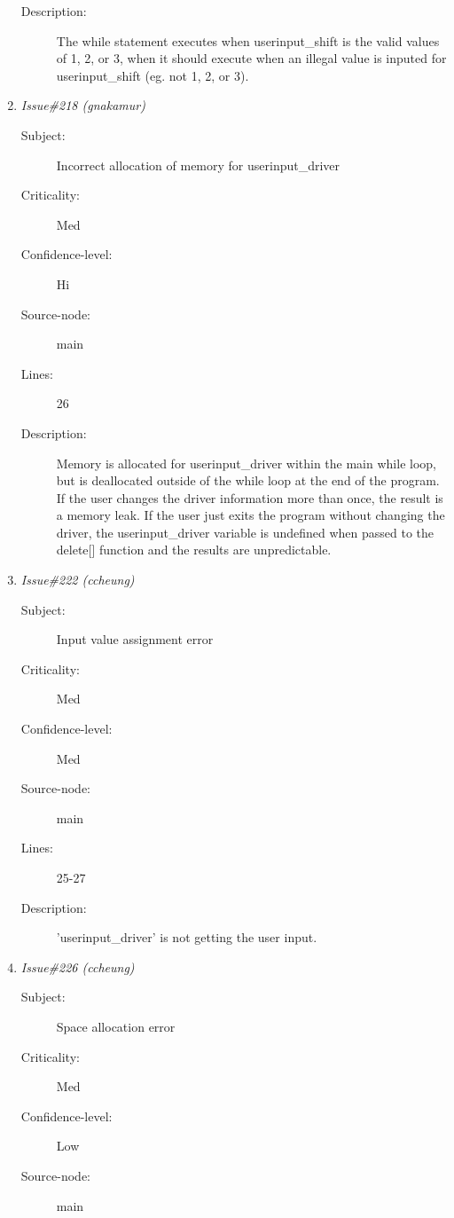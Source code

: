 \begin{enumerate}
\begin{description}
\item [Description:] The while statement executes when userinput\_shift is the valid 
values of 1, 2, or 3, when it should execute when an illegal value is inputed
for userinput\_shift (eg. not 1, 2, or 3).
\end{description}
\item {\it Issue\#218 (gnakamur)}
\begin{description}
\item [Subject:] Incorrect allocation of memory for userinput\_driver
\item [Criticality:] Med
\item [Confidence-level:] Hi
\item [Source-node:] main

\item [Lines:] 26

\item [Description:] Memory is allocated for userinput\_driver within the main while 
loop, but is deallocated outside of the while loop at the end of the program.
If the user changes the driver information more than once, the result is a
memory leak.  If the user just exits the program without changing the driver,
the userinput\_driver variable is undefined when passed to the delete[]
function and the results are unpredictable.
\end{description}
\item {\it Issue\#222 (ccheung)}
\begin{description}
\item [Subject:] Input value assignment error
\item [Criticality:] Med
\item [Confidence-level:] Med
\item [Source-node:] main

\item [Lines:] 25-27

\item [Description:] 'userinput\_driver' is not getting the user input.
\end{description}
\item {\it Issue\#226 (ccheung)}
\begin{description}
\item [Subject:] Space allocation error
\item [Criticality:] Med
\item [Confidence-level:] Low
\item [Source-node:] main


\end{description}
\end{enumerate}
